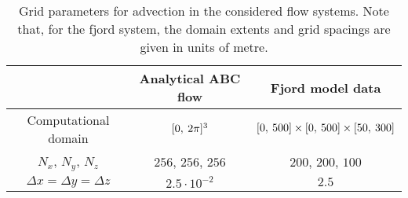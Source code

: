 \begin{table}[htpb]
    \centering
    \caption[Grid parameters for advection in the considered flow systems]
    {Grid parameters for advection in the considered flow systems. Note that,
    for the fjord system, the domain extents and grid spacings are given in
    units of metre.}
    \label{tab:gridparams}
    \begin{tabular}{ccc}
        \toprule
        & Analytical ABC flow & Fjord model data\\
        \midrule
        Computational domain & $[0,\hspace{0.5ex}2\pi]^{3}$ & $[0,\hspace{0.5ex}500]\times[0,\hspace{0.5ex}500]\times[50,\hspace{0.5ex}300]$\\
        $N_{x}$, $N_{y}$, $N_{z}$ & $256$, $256$, $256$ & $200$, $200$, $100$\\
        $\Delta{x} = \Delta{y} = \Delta{z}$ & $2.5\cdot10^{-2}$ & $2.5$\\
        \bottomrule
    \end{tabular}
\end{table}
